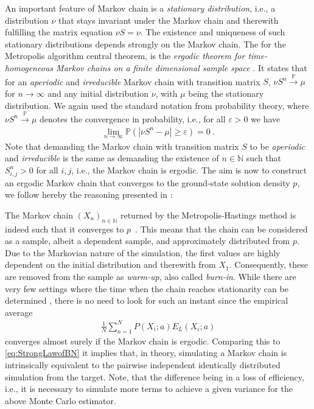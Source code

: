 \documentclass[11pt,a4paper]{article}
\numberwithin{equation}{section}
\begin{document}
An important feature of Markov chain is a {\it stationary distribution}, i.e., a distribution $\nu$ that stays invariant under the Markov chain and therewith fulfilling the matrix equation $\nu S = \nu$. 
%
The existence and uniqueness of such stationary distributions depends strongly on the Markov chain. 
%
The for the Metropolis algorithm central theorem, is the {\it ergodic theorem for time-homogeneous Markov chains on a finite dimensional sample space} \cite{norris1998markov,durrett2016essentials}. 
%
It states that for an {\it aperiodic} and {\it irreducible} Markov chain with transition matrix $S$, $\nu S^n\overset{\mathbb{P}}{\longrightarrow}\mu$ for $n\to \infty$ and any initial distribution $\nu$, with $\mu$ being the stationary distribution.
%
We again used the standard notation from probability theory, where $\nu S^n\overset{\mathbb{P}}{\longrightarrow}\mu$  denotes the convergence in probability, i.e., for all $\varepsilon > 0 $ we have 
\begin{align*}
\lim_{n\to \infty}\mathbb{P}(|\nu S^n - \mu|\geq\varepsilon)=0~.
\end{align*} 
%
Note that demanding the Markov chain with transition matrix $S$ to be {\it aperiodic} and {\it irreducible} is the same as demanding the existence of $n\in\mathbb{N}$ such that $S^n_{i,j}>0$ for all $i,j$, i.e., the Markov chain is ergodic.
%
The aim is now to construct an ergodic Markov chain that converges to the ground-state solution density $p$, we follow hereby the reasoning presented in \cite{robert1999metropolis}:

%
The Markov chain $(X_{n})_{n\in\mathbb{N}}$ returned by the Metropolis-Hastings method is indeed such that it converges to $p$~\cite{metropolis1953equation}. 
%
This means that the chain can be considered as a sample, albeit a dependent sample, and approximately distributed from $p$. 
%
Due to the Markovian nature of the simulation, the first values are highly dependent on the initial distribution and therewith from $X_1$.
%
Consequently, these are removed from the sample as {\it warm-up}, also called {\it burn-in}. 
%
While there are very few settings where the time when the chain reaches stationarity can be determined \cite{hobert2004mixture}, there is no need to look for such an instant since the empirical average
\begin{align*}
\frac{1}{N}\sum_{n=1}^NP(X_i;a)E_L(X_i;a)
\end{align*}
converges almost surely if the Markov chain is ergodic. 
%
Comparing this to \eqref{eq:StrongLawofBN} it implies that, in theory, simulating a Markov chain is intrinsically equivalent to the pairwise independent identically distributed simulation from the target.
%
Note, that the difference being in a loss of efficiency, i.e., it is necessary to simulate more terms to achieve a given variance for the above Monte Carlo estimator. 
\end{document}
